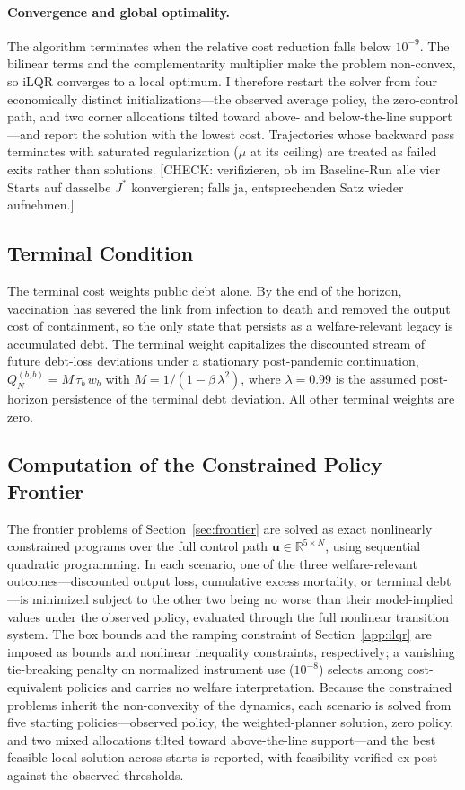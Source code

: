 \documentclass[12pt, a4paper]{article}
\begin{document}
\paragraph{Convergence and global optimality.}
The algorithm terminates when the relative cost reduction falls below
$10^{-9}$. The bilinear terms and the complementarity multiplier make the problem
non-convex, so iLQR converges to a local optimum. I therefore restart the solver
from four economically distinct initializations---the observed average policy,
the zero-control path, and two corner allocations tilted toward above- and
below-the-line support---and report the solution with the lowest cost.
Trajectories whose backward pass terminates with saturated regularization
($\mu$ at its ceiling) are treated as failed exits rather than solutions.
[CHECK: verifizieren, ob im Baseline-Run alle vier Starts auf dasselbe $J^*$
konvergieren; falls ja, entsprechenden Satz wieder aufnehmen.]

\subsection{Terminal Condition}
\label{app:terminal}

The terminal cost weights public debt alone. By the end of the horizon,
vaccination has severed the link from infection to death and removed the output
cost of containment, so the only state that persists as a welfare-relevant legacy
is accumulated debt. The terminal weight capitalizes the discounted stream of
future debt-loss deviations under a stationary post-pandemic continuation,
$Q_N^{(b,b)} = M\,\tau_b\, w_b$ with $M = 1/(1-\beta\,\lambda^2)$, where $\lambda = 0.99$
is the assumed post-horizon persistence of the terminal debt deviation. All other
terminal weights are zero.

\subsection{Computation of the Constrained Policy Frontier}
\label{app:frontier_comp}

The frontier problems of Section~\ref{sec:frontier} are solved as exact
nonlinearly constrained programs over the full control path
$\bm{u} \in \mathbb{R}^{5 \times N}$, using sequential quadratic programming. In
each scenario, one of the three welfare-relevant outcomes---discounted output
loss, cumulative excess mortality, or terminal debt---is minimized subject to
the other two being no worse than their model-implied values under the observed
policy, evaluated through the full nonlinear transition system. The box bounds
and the ramping constraint of Section~\ref{app:ilqr} are imposed as bounds and
nonlinear inequality constraints, respectively; a vanishing tie-breaking penalty
on normalized instrument use ($10^{-8}$) selects among cost-equivalent policies
and carries no welfare interpretation. Because the constrained problems inherit
the non-convexity of the dynamics, each scenario is solved from five starting
policies---observed policy, the weighted-planner solution, zero policy, and two
mixed allocations tilted toward above-the-line support---and the best feasible
local solution across starts is reported, with feasibility verified ex post
against the observed thresholds.
\end{document}
